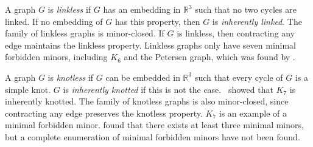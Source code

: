 A graph $G$ is \textit{linkless} if $G$ has an embedding in $\mathbb{R}^3$ such that no two cycles are linked. If no embedding of $G$ has this property, then $G$ is \textit{inherently linked}. The family of linkless graphs is minor-closed. If $G$ is linkless, then contracting any edge maintains the linkless property. Linkless graphs only have seven minimal forbidden minors, including $K_6$ and the Petersen graph, which was found by \textcite{robertsonSachsLinklessEmbedding1995}. 

A graph $G$ is \textit{knotless} if $G$ can be embedded in $\mathbb{R}^3$ such that every cycle of $G$ is a simple knot. $G$ is \textit{inherently knotted} if this is not the case.\ \textcite{conwayKnotsLinksSpatial1983} showed that $K_7$ is inherently knotted. The family of knotless graphs is also minor-closed, since contracting any edge preserves the knotless property. $K_7$ is an example of a minimal forbidden minor. \textcite{conwayKnotsLinksSpatial1983,foisyNewlyRecognizedIntrinsically2003,foisyIntrinsicallyKnottedGraphs2002} found that there exists at least three minimal minors, but a complete enumeration of minimal forbidden minors have not been found. 

